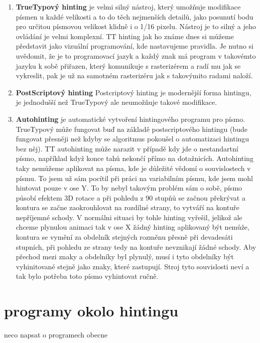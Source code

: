 \documentclass[a4paper]{article}
\begin{document}
\begin{enumerate}
\item \textbf{TrueTypový hinting}
je velmi silný nástroj, který umožňuje modifikace písmen u každé velikosti a to do těch nejmenších detailů, jako posunutí bodu pro určitou písmovou velikost klidně i o 1/16 pixelu. Nástroj je to silný a jeho ovládání je velmi komplexní. TT hinting jak ho známe dnes si můžeme představit jako vizuální programování, kde nastavujeme pravidla. Je nutno si uvědomit, že je to programovací jazyk a každý znak má program v takovémto jazyku k sobě přiřazen, který komunikuje s rasterizérem a radí mu jak se vykreslit, pak je už na samotném rasterizéru jak s takovýmito radami naloží.

\item \textbf{PostScriptový hinting}
Postcriptový hinting je modernější forma hintingu, je jednodušší než TrueTypový ale neumožňuje takové modifikace.

\item \textbf{Autohinting}
 je automatické vytvoření hintingového programu pro písmo. TrueTypový může fungovat buď na základě postscriptového hintingu (bude fungovat přesněji než kdyby se algoritmus pokoušel o automatizaci hintingu bez něj). TT autohinting může narazit v případě kdy jde o nestandartní písmo, například když konce tahů nekončí přímo na dotažnicích. Autohinting taky nemůžeme aplikovat na písma, kde je důležité vědomí o souvislostech v písmu. To jsem už sám pocítil při práci na variabilním písmu, kde jsem mohl hintovat pouze v ose Y. To by nebyl takovým problém sám o sobě, písmo působí efektem 3D rotace a při pohledu z 90 stupňů se začnou překrývat a kontura se začne zaokrouhlovat na rozdílné strany, to vytváří na kontuře nepříjemné schody. V normálni situaci by tohle hinting vyřešil, jelikož ale chceme plynulou animaci tak v ose X žádný hinting aplikovaný být nemůže, kontura se vymění za obdelník stejných rozměnu přesně při devadesáti stupních, při pohledu ze strany tedy na kontuře nevznikají žádné schody. Aby přechod mezi znaky a obdelníky byl plynulý, musí i tyto obdelníky být vyhinitované stejně jako znaky, které zastupují. Stroj tyto souvislosti neví a tak bylo potřeba toto písmo vyhintovat ručně.
\end{enumerate}

\section{programy okolo hintingu}
neco napsat o programech obecne
\end{document}
